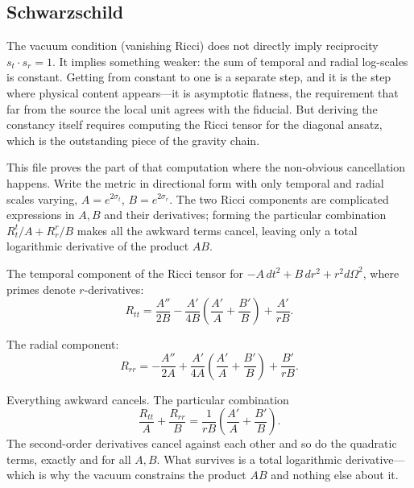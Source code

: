 \subsection{Schwarzschild}

The vacuum condition (vanishing Ricci) does not directly imply reciprocity $s_t \cdot s_r = 1$. It implies something weaker: the sum of temporal and radial log-scales is constant. Getting from constant to one is a separate step, and it is the step where physical content appears---it is asymptotic flatness, the requirement that far from the source the local unit agrees with the fiducial. But deriving the constancy itself requires computing the Ricci tensor for the diagonal ansatz, which is the outstanding piece of the gravity chain.

This file proves the part of that computation where the non-obvious cancellation happens. Write the metric in directional form with only temporal and radial scales varying, $A = e^{2\sigma_t}$, $B = e^{2\sigma_r}$. The two Ricci components are complicated expressions in $A, B$ and their derivatives; forming the particular combination $R_t^t/A + R_r^r/B$ makes all the awkward terms cancel, leaving only a total logarithmic derivative of the product $AB$.

\begin{definition}
The temporal component of the Ricci tensor for $-A\,dt^2 + B\,dr^2 + r^2 d\Omega^2$, where primes denote $r$-derivatives:
$$R_{tt} = \frac{A''}{2B} - \frac{A'}{4B}\left(\frac{A'}{A} + \frac{B'}{B}\right) + \frac{A'}{rB}.$$
\end{definition}

\begin{definition}
The radial component:
$$R_{rr} = -\frac{A''}{2A} + \frac{A'}{4A}\left(\frac{A'}{A} + \frac{B'}{B}\right) + \frac{B'}{rB}.$$
\end{definition}

\begin{theorem}
Everything awkward cancels. The particular combination
$$\frac{R_{tt}}{A} + \frac{R_{rr}}{B} = \frac{1}{rB}\left(\frac{A'}{A} + \frac{B'}{B}\right).$$
The second-order derivatives cancel against each other and so do the quadratic terms, exactly and for all $A, B$. What survives is a total logarithmic derivative---which is why the vacuum constrains the product $AB$ and nothing else about it. 
\end{theorem}

